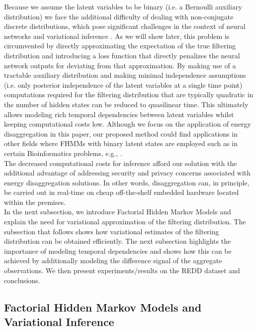 Because we assume the latent variables to be binary (i.e. a Bernoulli auxiliary distribution) we face the additional difficulty of dealing with non-conjugate discrete distributions, which pose significant challenges in the context of neural networks and variational inference \cite{kingma2013auto}. As we will show later, this problem is circumvented by directly approximating the expectation of the true filtering distribution and introducing a loss function that directly penalizes the neural network outputs for deviating from that approximation. By making use of a tractable auxiliary distribution and making minimal independence assumptions (i.e. only posterior independence of the latent variables at a single time point) computations required for the filtering distribution that are typically quadratic in the number of hidden states can be reduced to quasilinear time. This ultimately allows modeling rich temporal dependencies between latent variables whilst keeping computational costs low. Although we focus on the application of energy disaggregation in this paper, our proposed method could find applications in other fields where FHMMs with binary latent states are employed such as in certain Bioinformatics problems, e.g., \cite{stanculescu2014hierarchical,asif2011large}.\\
The decreased computational costs for inference afford our solution with the additional advantage of addressing security and privacy concerns associated with energy disaggregation solutions. In other words, disaggregation can, in principle, be carried out in real-time on cheap off-the-shelf embedded hardware located within the premises.\\
In the next subsection, we introduce Factorial Hidden Markov Models and explain the need for variational approximation of the filtering distribution. The subsection that follows shows how variational estimates of the filtering distribution can be obtained efficiently. The next subsection highlights the importance of modeling temporal dependencies and shows how this can be achieved by additionally modeling the difference signal of the aggregate observations. We then present experiments/results on the REDD dataset and conclusions.

\subsection{Factorial Hidden Markov Models and Variational Inference}

